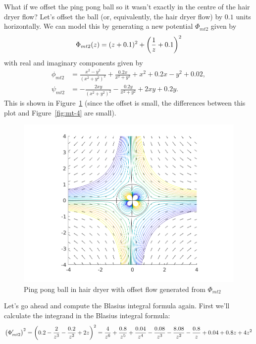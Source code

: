 \documentclass{article}
\begin{document}
What if we offset the ping pong ball so it wasn't exactly in the centre
of the hair dryer flow? Let's offset the ball (or, equivalently, the
hair dryer flow) by $0.1$ units horizontally. We can model this by
generating a new potential $\Phi_{mt2}$ given by
%
\begin{equation*}
    \Phi_{mt2}(z) = (z + 0.1)^2 + \del{\frac{1}{z} + 0.1}^2
\end{equation*}
%
with real and imaginary components given by
%
\begin{align*}
    \phi_{mt2} &= \frac{x^2 - y^2}{(x^2 + y^2)^2} + \frac{0.2 x}{x^2 + y^2} + x^2 + 0.2x - y^2 + 0.02, \\
    \psi_{mt2} &= - \frac{2 x y}{(x^2 + y^2)^2} - \frac{0.2 y}{x^2 + y^2} + 2 x y + 0.2 y
    .
\end{align*}
%
This is shown in Figure~\ref{fig:mt-5} (since the offset is small,
the differences between this plot and Figure~\ref{fig:mt-4} are
small).
%
\begin{figure}[ht]
    \includegraphics[width=35em]{mt_ex2_3}
    \centering
    \caption{Ping pong ball in hair dryer with offset flow generated from $\Phi_{mt2}$}
    \label{fig:mt-5}
\end{figure}
%
Let's go ahead and compute the Blasius integral formula again. First we'll calculate the integrand
in the Blasius integral formula:
%
\begin{equation*}
    \del{\Phi^\prime_{mt2}}^2
        = \del{0.2 - \frac{2}{z^3} - \frac{0.2}{z^2} + 2 z}^2
        = \frac{4}{z^6} + \frac{0.8}{z^5} + \frac{0.04}{z^4} - \frac{0.08}{z^3} - \frac{8.08}{z^2} - \frac{0.8}{z} + 0.04 + 0.8 z + 4 z^2
\end{equation*}
\end{document}
